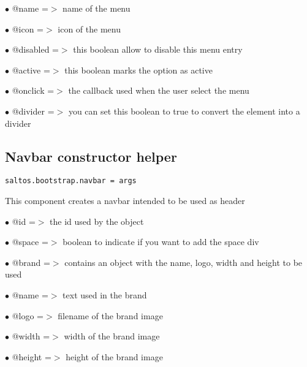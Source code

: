 \documentclass[a4paper]{book}
\begin{document}
\begin{compactitem}
\item[\color{myblue}$\bullet$] @name     =$>$ name of the menu
\item[\color{myblue}$\bullet$] @icon     =$>$ icon of the menu
\item[\color{myblue}$\bullet$] @disabled =$>$ this boolean allow to disable this menu entry
\item[\color{myblue}$\bullet$] @active   =$>$ this boolean marks the option as active
\item[\color{myblue}$\bullet$] @onclick  =$>$ the callback used when the user select the menu
\item[\color{myblue}$\bullet$] @divider  =$>$ you can set this boolean to true to convert the element into a divider
\end{compactitem}

\hypertarget{toc472}{}
\subsection{Navbar constructor helper}

\begin{lstlisting}
saltos.bootstrap.navbar = args
\end{lstlisting}

This component creates a navbar intended to be used as header

\begin{compactitem}
\item[\color{myblue}$\bullet$] @id    =$>$ the id used by the object
\item[\color{myblue}$\bullet$] @space =$>$ boolean to indicate if you want to add the space div
\item[\color{myblue}$\bullet$] @brand =$>$ contains an object with the name, logo, width and height to be used
\end{compactitem}

\begin{compactitem}
\item[\color{myblue}$\bullet$] @name   =$>$ text used in the brand
\item[\color{myblue}$\bullet$] @logo   =$>$ filename of the brand image
\item[\color{myblue}$\bullet$] @width  =$>$ width of the brand image
\item[\color{myblue}$\bullet$] @height =$>$ height of the brand image
\end{compactitem}
\end{document}
